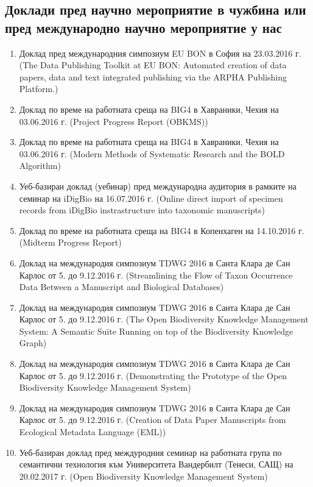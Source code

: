 \subsection*{Доклади пред научно мероприятие в чужбина или пред международно научно мероприятие у нас}

\begin{enumerate}
    \item Доклад пред международния симпозиум EU BON в София на 23.03.2016 г. (The Data Publishing Toolkit at EU BON: Automated creation of data papers, data and text integrated publishing via the ARPHA Publishing Platform.)
    \item Доклад по време на работната среща на BIG4 в Хавраники, Чехия на 03.06.2016 г. (Project Progress Report (OBKMS))
    \item Доклад по време на работната среща на BIG4 в Хавраники, Чехия на 03.06.2016 г. (Modern Methods of Systematic Research and the BOLD Algorithm)
    \item Уеб-базиран доклад (уебинар) пред международна аудитория в рамките на семинар на iDigBio на 16.07.2016 г. (Online direct import of specimen records from iDigBio instrastructure into taxonomic manuscripts)
    \item Доклад по време на работната среща на BIG4 в Копенхаген на 14.10.2016 г. (Midterm Progress Report)
    \item Доклад на международия симпозиум TDWG 2016 в Санта Клара де Сан Карлос от 5. до 9.12.2016 г. (Streamlining the Flow of Taxon Occurrence Data Between a Manuscript and Biological Databases)
    \item Доклад на международия симпозиум TDWG 2016 в Санта Клара де Сан Карлос от 5. до 9.12.2016 г. (The Open Biodiversity Knowledge Management System: A Semantic Suite Running on top of the Biodiversity Knowledge Graph)
    \item Доклад на международия симпозиум TDWG 2016 в Санта Клара де Сан Карлос от 5. до 9.12.2016 г. (Demonstrating the Prototype of the Open Biodiversity Knowledge Management System)
    \item Доклад на международия симпозиум TDWG 2016 в Санта Клара де Сан Карлос от 5. до 9.12.2016 г. (Creation of Data Paper Manuscripts from Ecological Metadata Language (EML))
    \item Уеб-базиран доклад пред междуродния семинар на работната група по семантични технология към Университета Вандербилт (Тенеси, САЩ) на 20.02.2017 г. (Open Biodiversity Knowledge Management System)

\end{enumerate}
